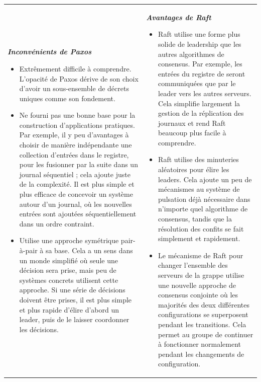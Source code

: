 \begin{tabular}{p{}p{}}
    \noindent
    \textbf{\textit{Inconvénients de Paxos}}

    \begin{itemize}
        \item Extrêmement difficile à comprendre. L'opacité de Paxos dérive de
            son choix d'avoir un sous-ensemble de décrets uniques comme son
            fondement.
        \item Ne fourni pas une bonne base pour la construction d'applications
            pratiques. Par exemple, il y peu d'avantages à choisir de manière
            indépendante une collection d'entrées dans le registre, pour les
            fusionner par la suite dans un journal séquentiel ; cela ajoute
            juste de la complexité. Il est plus simple et plus efficace de
            concevoir un système autour d'un journal, où les nouvelles entrées
            sont ajoutées séquentiellement dans un ordre contraint.
        \item Utilise une approche symétrique pair-à-pair à sa base. Cela a un
            sens dans un monde simplifié où seule une décision sera prise, mais
            peu de systèmes concrets utilisent cette approche.  Si une série de
            décisions doivent être prises, il est plus simple et plus rapide
            d'élire d'abord un leader, puis de le laisser coordonner les
            décisions.
    \end{itemize} 
    
    &

    \textbf{\textit{Avantages de Raft}}

    \begin{itemize}
        \item Raft utilise une forme plus solide de leadership que les autres
            algorithmes de consensus. Par exemple, les entrées du registre de
            seront communiquées que par le leader vers les autres serveurs. Cela
            simplifie largement la gestion de la réplication des journaux et
            rend Raft beaucoup plus facile à comprendre.
        \item Raft utilise des minuteries aléatoires pour élire les leaders.
            Cela ajoute un peu de mécanismes au système de pulsation déjà
            nécessaire dans n'importe quel algorithme de consensus, tandis que
            la résolution des confits se fait simplement et rapidement.
        \item Le mécanisme de Raft pour changer l'ensemble des serveurs de la
            grappe utilise une nouvelle approche de consensus conjointe où les
            majorités des deux différentes configurations se superposent pendant
            les transitions. Cela permet au groupe de continuer à fonctionner
            normalement pendant les changements de configuration.
    \end{itemize}

\end{tabular}

